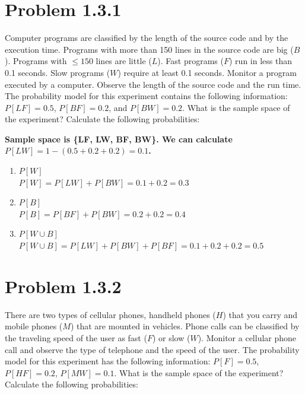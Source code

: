 \documentclass{article}
\begin{document}
\newpage

\section*{Problem 1.3.1}
Computer programs are classified by the length of the source code and by the execution time. Programs with more than 150 lines in the source code are big ($B$). Programs with $\le 150$ lines are little ($L$). Fast programs ($F$) run in less than 0.1 seconds. Slow programs ($W$) require at least 0.1 seconds. Monitor a program executed by a computer. Observe the length of the source code and the run time. The probability model for this experiment contains the following information: $P[LF] = 0.5$, $P[BF] = 0.2$, and $P[BW] = 0.2$. What is the sample space of the experiment? Calculate the following probabilities:

{\boldmath\textbf{Sample space is \{LF, LW, BF, BW\}. We can calculate $P[LW] = 1 - (0.5+0.2+0.2) = 0.1$.}}

\begin{enumerate}[label=(\alph*)]
    \item $P[W]$ \\
    {\boldmath\textbf{$P[W] = P[LW] + P[BW] = 0.1 + 0.2 = 0.3$}}
    
    \item $P[B]$ \\
    {\boldmath\textbf{$P[B] = P[BF] + P[BW] = 0.2 + 0.2 = 0.4$}}
    
    \item $P[W \cup B]$ \\
    {\boldmath\textbf{$P[W \cup B] = P[LW] + P[BW] + P[BF] = 0.1 + 0.2 + 0.2 = 0.5$}}
\end{enumerate}

\newpage

\section*{Problem 1.3.2}
There are two types of cellular phones, handheld phones ($H$) that you carry and mobile phones ($M$) that are mounted in vehicles. Phone calls can be classified by the traveling speed of the user as fast ($F$) or slow ($W$). Monitor a cellular phone call and observe the type of telephone and the speed of the user. The probability model for this experiment has the following information: $P[F] = 0.5$, $P[HF] = 0.2$, $P[MW] = 0.1$. What is the sample space of the experiment? Calculate the following probabilities:
\end{document}
